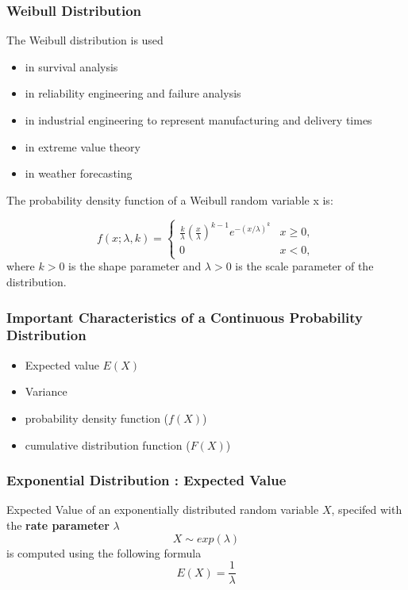 \documentclass[11pt]{beamer} %
\begin{document}
\begin{frame}
\frametitle{Weibull Distribution}
The Weibull distribution is used
\begin{itemize}
\item in survival analysis
\item in reliability engineering and failure analysis
\item in industrial engineering to represent manufacturing and delivery times
\item in extreme value theory
\item in weather forecasting
\end{itemize}
\end{frame}
\begin{frame}
The probability density function of a Weibull random variable x is:

\[
f(x;\lambda,k) =
\begin{cases}
\frac{k}{\lambda}\left(\frac{x}{\lambda}\right)^{k-1}e^{-(x/\lambda)^{k}} & x\geq 0 ,\\
0 & x<0,
\end{cases}
\]
where $k > 0$ is the shape parameter and $\lambda > 0$ is the scale parameter of the distribution.


\end{frame}


\begin{frame}
\frametitle{Important Characteristics of a Continuous Probability Distribution }
\begin{itemize}
\item Expected value $E(X)$
\item Variance
\item probability density function ($f(X)$)
\item cumulative distribution function ($F(X)$)
\end{itemize}
\end{frame}
\begin{frame}
\frametitle{Exponential Distribution : Expected Value}
Expected Value of an exponentially distributed random variable $X$, specifed with the \textbf{rate parameter} $\lambda$
\[ X \sim exp(\lambda)  \]
is computed using the following formula
\[ E(X) = \frac{1}{\lambda} \]

\end{frame}
\end{document}
